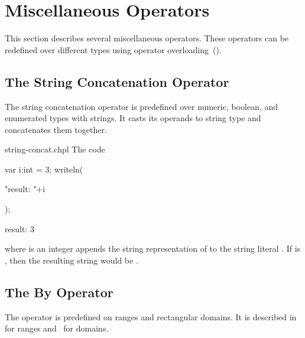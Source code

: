 \section{Miscellaneous Operators}
\label{Miscellaneous_Operators}

This section describes several miscellaneous operators.  These
operators can be redefined over different types using operator
overloading~().

\subsection{The String Concatenation Operator}
\label{The_String_Concatenation_Operator}

The string concatenation operator \chpl{+} is predefined over numeric, boolean,
and enumerated types with strings. It casts its operands to string type and
concatenates them together.

\begin{chapelexample}{string-concat.chpl}
The code
\begin{chapelnoprint}
var i:int = 3;
writeln(
\end{chapelnoprint}
\begin{chapel}
"result: "+i
\end{chapel}
\begin{chapelnoprint}
);
\end{chapelnoprint}
\begin{chapeloutput}
result: 3
\end{chapeloutput}
where  is an integer appends the string representation of  to the
string literal .  If  is , then the resulting string
would be .
\begin{chapelnoprint}
\end{chapelnoprint}
\end{chapelexample}

\subsection{The By Operator}
\label{The_By_Operator}

The operator  is predefined on ranges and rectangular domains.
It is described in~ for ranges
and~ for domains.

